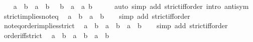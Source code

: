\begin{isabellebody}
\isamarkupfalse%
\isanewline
\ \ \isamarkupfalse%
\ {\isacartoucheopen}a\ \isactrlbold {\isacharless}{\kern0pt}\ b\ {\isasymlongleftrightarrow}\ a\ \isactrlbold {\isasymle}\ b\ {\isasymand}\ {\isasymnot}\ b\ \isactrlbold {\isasymle}\ a{\isacartoucheclose}\ \ a\ b\isanewline
\ \ \ \ \isamarkupfalse%
\ {\isacharparenleft}{\kern0pt}auto\ simp\ add{\isacharcolon}{\kern0pt}\ strict{\isacharunderscore}{\kern0pt}iff{\isacharunderscore}{\kern0pt}order\ intro{\isacharcolon}{\kern0pt}\ antisym{\isacharparenright}{\kern0pt}\isanewline
{}\isamarkupfalse%
%
\endisatagproof
{\isafoldproof}%
%
\isadelimproof
\isanewline
%
\endisadelimproof
\isanewline
{}\isamarkupfalse%
\ strict{\isacharunderscore}{\kern0pt}implies{\isacharunderscore}{\kern0pt}not{\isacharunderscore}{\kern0pt}eq{\isacharcolon}{\kern0pt}\isanewline
\ \ {\isacartoucheopen}a\ \isactrlbold {\isacharless}{\kern0pt}\ b\ {\isasymLongrightarrow}\ a\ {\isasymnoteq}\ b{\isacartoucheclose}\isanewline
%
\isadelimproof
\ \ %
\endisadelimproof
%
\isatagproof
{}\isamarkupfalse%
\ {\isacharparenleft}{\kern0pt}simp\ add{\isacharcolon}{\kern0pt}\ strict{\isacharunderscore}{\kern0pt}iff{\isacharunderscore}{\kern0pt}order{\isacharparenright}{\kern0pt}%
\endisatagproof
{\isafoldproof}%
%
\isadelimproof
\isanewline
%
\endisadelimproof
\isanewline
{}\isamarkupfalse%
\ not{\isacharunderscore}{\kern0pt}eq{\isacharunderscore}{\kern0pt}order{\isacharunderscore}{\kern0pt}implies{\isacharunderscore}{\kern0pt}strict{\isacharcolon}{\kern0pt}\isanewline
\ \ {\isacartoucheopen}a\ {\isasymnoteq}\ b\ {\isasymLongrightarrow}\ a\ \isactrlbold {\isasymle}\ b\ {\isasymLongrightarrow}\ a\ \isactrlbold {\isacharless}{\kern0pt}\ b{\isacartoucheclose}\isanewline
%
\isadelimproof
\ \ %
\endisadelimproof
%
\isatagproof
{}\isamarkupfalse%
\ {\isacharparenleft}{\kern0pt}simp\ add{\isacharcolon}{\kern0pt}\ strict{\isacharunderscore}{\kern0pt}iff{\isacharunderscore}{\kern0pt}order{\isacharparenright}{\kern0pt}%
\endisatagproof
{\isafoldproof}%
%
\isadelimproof
\isanewline
%
\endisadelimproof
\isanewline
{}\isamarkupfalse%
\ order{\isacharunderscore}{\kern0pt}iff{\isacharunderscore}{\kern0pt}strict{\isacharcolon}{\kern0pt}\isanewline
\ \ {\isacartoucheopen}a\ \isactrlbold {\isasymle}\ b\ {\isasymlongleftrightarrow}\ a\ \isactrlbold {\isacharless}{\kern0pt}\ b\ {\isasymor}\ a\ {\isacharequal}{\kern0pt}\ b{\isacartoucheclose}\isanewline
%
\isadelimproof
\ \ %
\endisadelimproof
%
\isatagproof
{}\isamarkupfalse%

\end{isabellebody}
